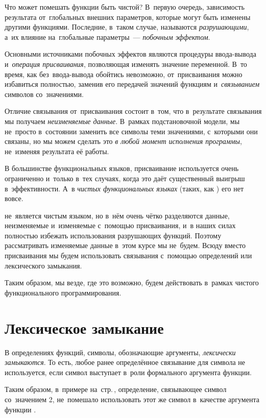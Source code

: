 Что может помешать функции быть чистой? В~первую очередь, зависимость результата от~глобальных внешних параметров, которые могут быть изменены другими функциями. Последние, в~таком случае, называются \emph{разрушающими}, а~их влияние на~глобальные параметры~--- \emph{побочным эффектом}.

Основными источниками побочных эффектов являются процедуры ввода-вывода и~\emph{операция присваивания}, позволяющая изменять значение переменной. В~то время, как без~ввода-вывода обойтись невозможно, от~присваивания можно избавиться полностью, заменив его передачей значений функциям и~\emph{связыванием} символов со~значениями.

Отличие связывания от~присваивания состоит в~том, что в~результате связывания мы получаем \emph{неизменяемые данные}. В~рамках подстановочной модели, мы не~просто в~состоянии заменить все символы теми значениями, с~которыми они связаны, но мы можем сделать это \emph{в любой момент исполнения программы}, не~изменяя результата её работы.

В большинстве функциональных языков, присваивание используется очень ограниченно и~только в~тех случаях, когда это даёт существенный выигрыш в~эффективности. А~в \emph{чистых функциональных языках} (таких, как ) его нет вовсе.

\Scheme не~является чистым языком, но в~нём очень чётко разделяются данные, неизменяемые и~изменяемые с~помощью присваивания, и~в наших силах полностью избежать использования разрушающих функций. Поэтому рассматривать изменяемые данные в~этом курсе мы не~будем. Всюду вместо присваивания мы будем использовать связывания с~помощью определений или лексического замыкания.

Таким образом, мы везде, где это возможно, будем действовать в~рамках чистого функционального программирования.

\section{Лексическое замыкание}%
В определениях функций, символы, обозначающие аргументы, \emph{лексически замыкаются}. То есть, любое ранее определённое связывание для символа не используется, если символ выступает в~роли формального аргумента функции.

Таким образом, в~примере на~стр.\,\pageref{define}, определение, связывающее символ  со~значением 2, не~помешало использовать этот же символ в~качестве аргумента функции .

